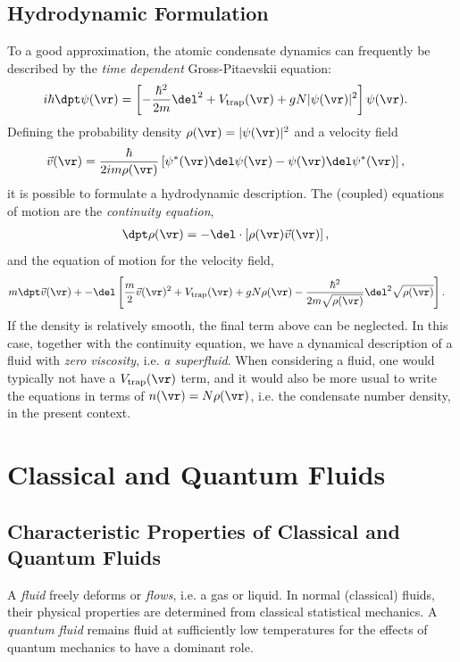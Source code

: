 \documentclass[qo.tex]{subfiles}
\begin{document}
\section{Hydrodynamic Formulation}
To a good approximation, the atomic condensate dynamics can frequently be described by the \emph{time dependent} Gross-Pitaevskii equation:
\begin{align}
    i\hbar\dpt\psi(\vr) &= \left[-\frac{\hbar^2}{2m}\del^2 + V_{\text{trap}}(\vr) + gN|\psi(\vr)|^2\right]\psi(\vr).
\end{align}
Defining the probability density $\rho(\vr)=|\psi(\vr)|^2$ and a velocity field
\begin{align}
    \vec{v}(\vr) &= \frac{\hbar}{2im\rho(\vr)}\left[\psi^*(\vr)\del\psi(\vr) - \psi(\vr)\del\psi^*(\vr)\right],
\end{align}
it is possible to formulate a hydrodynamic description. 
The (coupled) equations of motion are the \emph{continuity equation},
\begin{align}
    \dpt\rho(\vr) &= -\del\cdot\left[\rho(\vr)\vec{v}(\vr)\right],
\end{align}
and the equation of motion for the velocity field,
\begin{align}
    m\dpt\vec{v}(\vr) &+ -\del\left[\frac{m}{2}\vec{v}(\vr)^2 + V_{\text{trap}}(\vr) + gN\rho(\vr) - \frac{\hbar^2}{2m\sqrt{\rho(\vr)}}\del^2\sqrt{\rho(\vr)}\right].
\end{align}
If the density is relatively smooth, the final term above can be neglected. 
In this case, together with the continuity equation, we have a dynamical description of a fluid with \emph{zero viscosity}, i.e. \emph{a superfluid}.
When considering a fluid, one would typically not have a $V_{\text{trap}}(\vr)$ term, and it would also be more usual to write the equations in terms of $n(\vr)=N\rho(\vr)$, i.e. the condensate number density, in the present context.

\chapter{Classical and Quantum Fluids}
\section{Characteristic Properties of Classical and Quantum Fluids}
A \emph{fluid} freely deforms or \emph{flows}, i.e. a gas or liquid. 
In normal (classical) fluids, their physical properties are determined from classical statistical mechanics.
A \emph{quantum fluid} remains fluid at sufficiently low temperatures for the effects of quantum mechanics to have a dominant role. 
\end{document}
